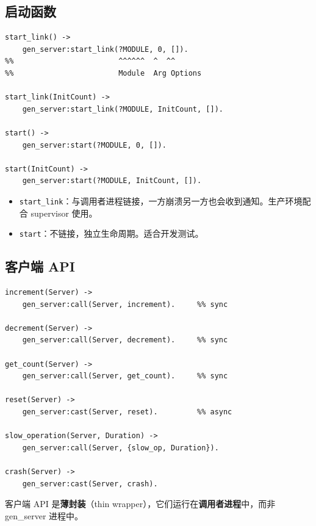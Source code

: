 \documentclass[a4paper,11pt]{article}
\begin{document}
\subsection{启动函数}

\begin{lstlisting}[style=erlangstyle, caption={启动函数 --- start\_link 与 start}]
start_link() ->
    gen_server:start_link(?MODULE, 0, []).
%%                        ^^^^^^  ^  ^^
%%                        Module  Arg Options

start_link(InitCount) ->
    gen_server:start_link(?MODULE, InitCount, []).

start() ->
    gen_server:start(?MODULE, 0, []).

start(InitCount) ->
    gen_server:start(?MODULE, InitCount, []).
\end{lstlisting}

\begin{tipbox}
\begin{itemize}[leftmargin=1.5em]
    \item \texttt{start\_link}：与调用者进程链接，一方崩溃另一方也会收到通知。生产环境配合 supervisor 使用。
    \item \texttt{start}：不链接，独立生命周期。适合开发测试。
\end{itemize}
\end{tipbox}

\subsection{客户端 API}

\begin{lstlisting}[style=erlangstyle, caption={客户端 API --- 对 gen\_server 调用的封装}]
increment(Server) ->
    gen_server:call(Server, increment).     %% sync

decrement(Server) ->
    gen_server:call(Server, decrement).     %% sync

get_count(Server) ->
    gen_server:call(Server, get_count).     %% sync

reset(Server) ->
    gen_server:cast(Server, reset).         %% async

slow_operation(Server, Duration) ->
    gen_server:call(Server, {slow_op, Duration}).

crash(Server) ->
    gen_server:cast(Server, crash).
\end{lstlisting}

\begin{warnbox}[注意]
客户端 API 是\textbf{薄封装}（thin wrapper），它们运行在\textbf{调用者进程}中，而非 gen\_server 进程中。
\end{warnbox}
\end{document}
